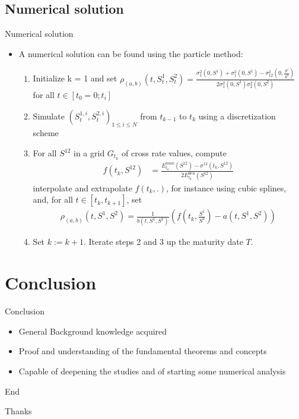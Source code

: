 \documentclass[10pt]{beamer} %
\begin{document}
    \subsection{Numerical solution}
    \begin{frame}[t]{Numerical solution}
    \begin{itemize}
    \item <+-> A numerical solution can be found using the particle method:
    
	\begin{enumerate}
	\item Initialize k = 1 and set $\rho_{(a,b)}(t,S_t^1,S_t^2) = \frac{\sigma_1^2(0,S^1)+\sigma_1^2(0,S^1)-\sigma_{12}^2(0,\frac{S^1}{S^2})}{2\sigma_1^2(0,S^1)\sigma_2^2(0,S^2)}$ for all $t \in [t_0 = 0; t_i]$
	\item Simulate $(S_t^{1,i},S_t^{2,i})_{1\leq i \leq N}$ from $t_{k-1}$ to $t_k$ using a discretization scheme
\item For all $S^{12}$ in a grid $G_{t_k}$ of cross rate values, compute
\begin{align*}
f(t_k, S^{12}) &= \frac{E_{t_k}^{num}(S^{12}) - \sigma^{12}(t_k,S^{12})}{2E_{t_k}^{den}(S^{12})}
\end{align*}
interpolate and extrapolate $f(t_k,.)$, for instance using cubic splines, and, for all $t \in [t_k, t_{k+1}]$, set
\begin{align*}
\rho_{(a,b)}(t,S^1,S^2)=\frac{1}{b(t,S^1,S^2)}\left(f\left(t_k,\frac{S^1}{S^2}\right)-a(t,S^1,S^2)\right)
\end{align*}
\item Set $k := k +1$. Iterate steps 2 and 3 up the maturity date $T$.
	\end{enumerate}
    \end{itemize}
    \end{frame}
    
	\section{Conclusion} %
	\label{sec:conclusion}
	
	\begin{frame}[t]{Conclusion}
		\begin{itemize}
			\item<+-> General Background knowledge acquired
			\item<+-> Proof and understanding of the fundamental theorems and concepts
			\item<+-> Capable of deepening the studies and of starting some numerical analysis
		\end{itemize}
	\end{frame}
	\begin{frame}[c]{End}
		\begin{center}
		\Huge Thanks
		\end{center}
	\end{frame}
\end{document}
